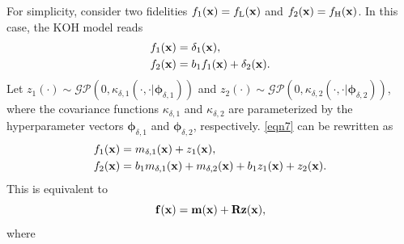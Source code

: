 \documentclass[journal ]{new-aiaa}
\begin{document}
	For simplicity, consider two fidelities $f_{1}({\bf x})=f_\text{L}({\bf x})$ and $f_{2}({\bf x})=f_\text{H}({\bf x})$.
	In this case, the KOH model reads
	\begin{subequations}\label{eqn7}
		\begin{align}
			f_1({\bf x}) & = \delta_1({\bf x}) 
			\label{eqn7-1},\\
			f_2({\bf x}) & = b_{1} f_{1}({\bf x}) + \delta_2({\bf x})
			\label{eqn7-2}.
		\end{align}
	\end{subequations}
	Let $z_1({\cdot}) \sim \mathcal{GP}\left(0,\kappa_{\delta,1}(\cdot,\cdot|{\boldsymbol \phi}_{\delta,1})\right)$ and $z_2({\cdot}) \sim \mathcal{GP}\left(0,\kappa_{\delta,2}(\cdot,\cdot|{\boldsymbol \phi}_{\delta,2})\right)$, where the covariance functions $\kappa_{\delta,1}$ and $\kappa_{\delta,2}$ are parameterized by the hyperparameter vectors ${\boldsymbol \phi}_{\delta,1}$ and ${\boldsymbol \phi}_{\delta,2}$, respectively.
	\cref{eqn7} can be rewritten as
	\begin{subequations}\label{eqn8}
		\begin{align}
			f_1({\bf x}) & = m_{\delta,1}({\bf x}) + z_1({\bf x}) 
			\label{eqn8-1},\\
			f_2({\bf x}) & = b_1  m_{\delta,1}({\bf x}) + m_{\delta,2}({\bf x}) + b_1 z_1({\bf x}) + z_2({\bf x})
			\label{eqn8-2}.
		\end{align}
	\end{subequations}
	This is equivalent to
	\begin{equation}\label{eqn9}
		{\bf f}({\bf x}) =  {\bf m}({\bf x}) + {\bf R} {\bf z}({\bf x}),
	\end{equation}
	where
\end{document}
